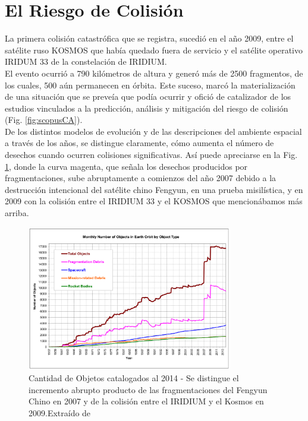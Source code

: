 \section{El Riesgo de Colisi\'on}

La primera colisi\'on catastr\'ofica que se registra, sucedi\'o en el a\~no 2009, entre el sat\'elite ruso KOSMOS  que hab\'ia quedado fuera de servicio y el sat\'elite operativo IRIDUM 33 de la constelaci\'on de IRIDIUM.\\

El evento ocurri\'o a 790 kil\'ometros de altura y gener\'o m\'as de 2500 fragmentos, de los cuales, 500 a\'un permanecen en \'orbita. Este suceso, marc\'o la materializaci\'on de una situaci\'on que se preve\'ia que pod\'ia ocurrir y ofici\'o de catalizador de los estudios vinculados a la predicci\'on, an\'alisis y mitigaci\'on del riesgo de colisi\'on (Fig. \ref{fig:scopusCA}).\\

De los distintos modelos de evoluci\'on y de las descripciones del ambiente espacial a trav\'es de los a\~nos, se distingue claramente, c\'omo aumenta el n\'umero de desechos cuando ocurren colisiones significativas. As\'i puede apreciarse en la Fig. \ref{fig:cantidad2014}, donde la curva magenta, que se\~nala los desechos producidos por fragmentaciones, sube abruptamente a comienzos del a\~no 2007 debido a la destrucci\'on intencional del sat\'elite chino Fengyun, en una prueba misil\'istica, y en 2009 con la colisi\'on entre el IRIDIUM 33 y el KOSMOS que mencion\'abamos m\'as arriba.\\

\begin{figure}[!h]
  \centering
  \includegraphics[width=0.8\textwidth]{imagenes/numero2014}
  \caption[Cantidad de Objetos catalogados al 2014]{Cantidad de Objetos catalogados al 2014 - Se distingue el incremento abrupto producto de las fragmentaciones del Fengyun Chino en 2007 y de la colisi\'on entre el IRIDIUM y el Kosmos en 2009.Extra\'ido de \citep{ODQN14}}
  \label{fig:cantidad2014}
\end{figure}

